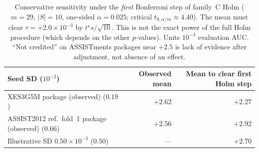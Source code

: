 \begin{table}[tbp]
\caption{Conservative sensitivity under the \emph{first}
Bonferroni step of family~C Holm ($m{=}29$, $|S|{=}10$, one-sided
$\alpha{=}0.025$; critical $t_{9,\alpha/m}\approx 4.40$). The mean
must clear $\tau{=}{+}2.0\times 10^{-3}$ by $t^\star s/\sqrt{10}$.
This is not the exact power of the full Holm procedure (which
depends on the other $p$-values). Units $10^{-3}$ evaluation AUC.
``Not credited'' on ASSISTments packages near $+2.5$ is lack of
evidence after adjustment, not absence of an effect.}
\label{tab:credit-primary-mde}
\centering
\footnotesize
\setlength{\tabcolsep}{4pt}
\begin{tabular}{@{}p{5.6cm}rr@{}}
\toprule
Seed SD ($10^{-3}$) & Observed mean & Mean to clear first Holm step \\
\midrule
XES3G5M package (observed) ($0.19$) & +2.62 & +2.27 \\
ASSIST2012 ref.\ fold~1 package (observed) ($0.66$) & +2.56 & +2.92 \\
Illustrative SD $0.50\times 10^{-3}$ ($0.50$) & --- & +2.70 \\
\bottomrule
\end{tabular}
\end{table}
